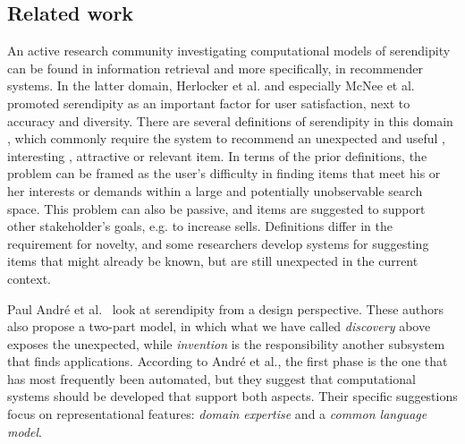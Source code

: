 \subsection{Related work} \label{sec:related}

An active research community investigating computational models of serendipity can be found in information retrieval \cite{Toms2000} and more specifically, in recommender systems. In the latter domain, Herlocker et al. \cite{Herlocker2004} and especially McNee et al. \cite{McNee2006} promoted serendipity as an important factor for user satisfaction, next to accuracy and diversity. There are several definitions of serendipity in this domain \cite{Lu2012}, which commonly require the system to recommend an unexpected and useful \cite{Lu2012}, interesting \cite{Herlocker2004}, attractive or relevant \cite{Ge2010} item. In terms of the prior definitions, the problem can be framed as the user's difficulty in finding items that meet his or her interests or demands within a large and potentially unobservable search space. This problem can also be passive, and items are suggested to support other stakeholder's goals, e.g. to increase sells. Definitions differ in the requirement for novelty, and some researchers \cite{Adamopoulos2011} develop systems for suggesting items that might already be known, but are still unexpected in the current context.

Paul Andr{\'e} et al.~\citeyear{andre2009discovery} look at
serendipity from a design perspective.  These authors also propose a
two-part model, in which what we have called \emph{discovery} above
exposes the unexpected, while \emph{invention} is the responsibility
another subsystem that finds applications.  According to Andr\'e et
al., the first phase is the one that has most frequently been
automated, but they suggest that computational systems should be
developed that support both aspects.  Their specific suggestions focus
on representational features: \emph{domain expertise} and a
\emph{common language model}.

